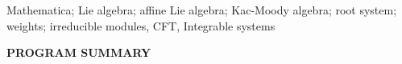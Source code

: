 \documentclass[preprint,12pt]{elsarticle}
\begin{document}
\begin{frontmatter}
\begin{abstract}
%



\end{abstract}

\begin{keyword}

Mathematica; Lie algebra; affine Lie algebra; Kac-Moody algebra; root system; weights; irreducible modules, CFT, Integrable systems
\end{keyword}

\end{frontmatter}



{\bf PROGRAM SUMMARY}%
\end{document}
